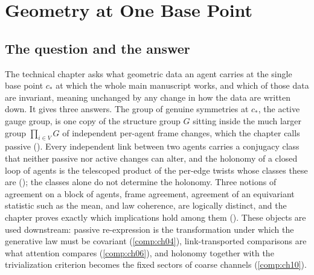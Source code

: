 \chapter{Geometry at One Base Point}
\label{comp:ch02}

\section{The question and the answer}
\label{comp:ch02-question}

The technical chapter asks what geometric data an agent carries at the single base point $c_*$ at which the
whole main manuscript works, and which of those data are invariant, meaning unchanged by any change in how
the data are written down. It gives three answers. The group of genuine symmetries at $c_*$, the active
gauge group, is one copy of the structure group $G$ sitting inside the much larger group $\prod_{i\in V}G$
of independent per-agent frame changes, which the chapter calls passive ().
Every independent link between two agents carries a conjugacy class that neither passive nor active changes
can alter, and the holonomy of a closed loop of agents is the telescoped product of the per-edge twists whose
classes these are (); the classes alone do not determine the holonomy.
Three notions of agreement on a block of agents, frame agreement, agreement of an equivariant statistic
such as the mean, and law coherence, are logically distinct, and the chapter proves exactly which
implications hold among them (). These objects are used downstream: passive
re-expression is the transformation under which the generative law must be covariant (\cref{comp:ch04}),
link-transported comparisons are what attention compares (\cref{comp:ch06}), and holonomy together with the
trivialization criterion becomes the fixed sectors of coarse channels (\cref{comp:ch10}).

